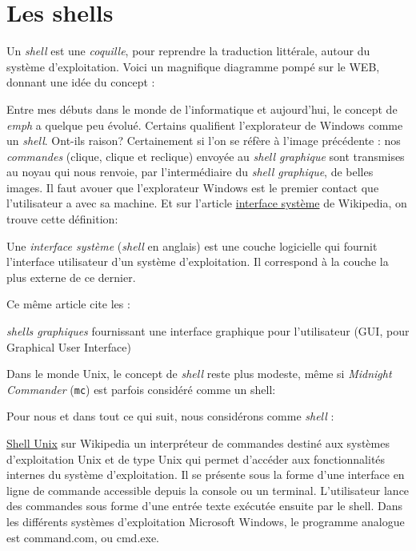 
\section{Les shells}
Un \emph{shell} est une \emph{coquille}, pour reprendre la traduction littérale, autour du système d'exploitation. Voici un magnifique diagramme pompé sur le WEB, donnant une idée du concept :


Entre mes débuts dans le monde de l'informatique et aujourd'hui, le concept de \emph{emph} a quelque peu évolué. Certains qualifient l'explorateur de Windows comme un \emph{shell}. Ont-ils raison? Certainement si l'on se réfère à l'image précédente : nos \emph{commandes} (clique, clique et reclique) envoyée au \emph{shell graphique} sont transmises au noyau qui nous renvoie, par l'intermédiaire du \emph{shell graphique}, de belles images. Il faut avouer que l'explorateur Windows est le premier contact que l'utilisateur a avec sa machine.  Et sur l'article \href{http://fr.wikipedia.org/wiki/Interface_syst%C3%A8me}{interface système} de Wikipedia, on trouve cette définition:

\begin{Quote}
Une \emph{interface système }(\emph{shell} en anglais) est une couche logicielle qui fournit l'interface utilisateur d'un système d'exploitation. Il correspond à la couche la plus externe de ce dernier.
\end{Quote}

Ce même article cite les :
\begin{Quote}
\emph{shells graphiques} fournissant une interface graphique pour l'utilisateur (GUI, pour Graphical User Interface)
\end{Quote}



Dans le monde Unix, le concept de \emph{shell} reste plus modeste, même si \emph{Midnight Commander} (\texttt{mc}) est parfois considéré comme un shell:


Pour nous et dans tout ce qui suit, nous considérons comme \emph{shell} :

\begin{Quotebis}{\href{http://fr.wikipedia.org/wiki/Shell_Unix}{Shell Unix} sur Wikipedia}
un interpréteur de commandes destiné aux systèmes d'exploitation Unix et de type Unix qui permet d'accéder aux fonctionnalités internes du système d'exploitation. Il se présente sous la forme d'une interface en ligne de commande accessible depuis la console ou un terminal. L'utilisateur lance des commandes sous forme d'une entrée texte exécutée ensuite par le shell. Dans les différents systèmes d'exploitation Microsoft Windows, le programme analogue est command.com, ou cmd.exe.
\end{Quotebis}

